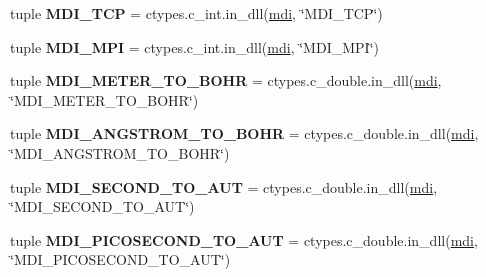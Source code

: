 \begin{DoxyCompactItemize}
\item 
\hypertarget{namespacemolssi__driver__interface_1_1mdi_a2cd83c28d46d7488dc81d0ab7d1e1b11}{tuple {\bfseries M\-D\-I\-\_\-\-T\-C\-P} = ctypes.\-c\-\_\-int.\-in\-\_\-dll(\hyperlink{classmdi}{mdi}, \char`\"{}M\-D\-I\-\_\-\-T\-C\-P\char`\"{})}\label{namespacemolssi__driver__interface_1_1mdi_a2cd83c28d46d7488dc81d0ab7d1e1b11}

\item 
\hypertarget{namespacemolssi__driver__interface_1_1mdi_a232cbdf0cd4b5f002a1163a9f71c5330}{tuple {\bfseries M\-D\-I\-\_\-\-M\-P\-I} = ctypes.\-c\-\_\-int.\-in\-\_\-dll(\hyperlink{classmdi}{mdi}, \char`\"{}M\-D\-I\-\_\-\-M\-P\-I\char`\"{})}\label{namespacemolssi__driver__interface_1_1mdi_a232cbdf0cd4b5f002a1163a9f71c5330}

\item 
\hypertarget{namespacemolssi__driver__interface_1_1mdi_a05bc005cf82c527130e4b3517355d24d}{tuple {\bfseries M\-D\-I\-\_\-\-M\-E\-T\-E\-R\-\_\-\-T\-O\-\_\-\-B\-O\-H\-R} = ctypes.\-c\-\_\-double.\-in\-\_\-dll(\hyperlink{classmdi}{mdi}, \char`\"{}M\-D\-I\-\_\-\-M\-E\-T\-E\-R\-\_\-\-T\-O\-\_\-\-B\-O\-H\-R\char`\"{})}\label{namespacemolssi__driver__interface_1_1mdi_a05bc005cf82c527130e4b3517355d24d}

\item 
\hypertarget{namespacemolssi__driver__interface_1_1mdi_a56a1ab0c7e9e1e0e55af72a20d1d0e3a}{tuple {\bfseries M\-D\-I\-\_\-\-A\-N\-G\-S\-T\-R\-O\-M\-\_\-\-T\-O\-\_\-\-B\-O\-H\-R} = ctypes.\-c\-\_\-double.\-in\-\_\-dll(\hyperlink{classmdi}{mdi}, \char`\"{}M\-D\-I\-\_\-\-A\-N\-G\-S\-T\-R\-O\-M\-\_\-\-T\-O\-\_\-\-B\-O\-H\-R\char`\"{})}\label{namespacemolssi__driver__interface_1_1mdi_a56a1ab0c7e9e1e0e55af72a20d1d0e3a}

\item 
\hypertarget{namespacemolssi__driver__interface_1_1mdi_ab087d6326f12a106a44d4ddaca4c8608}{tuple {\bfseries M\-D\-I\-\_\-\-S\-E\-C\-O\-N\-D\-\_\-\-T\-O\-\_\-\-A\-U\-T} = ctypes.\-c\-\_\-double.\-in\-\_\-dll(\hyperlink{classmdi}{mdi}, \char`\"{}M\-D\-I\-\_\-\-S\-E\-C\-O\-N\-D\-\_\-\-T\-O\-\_\-\-A\-U\-T\char`\"{})}\label{namespacemolssi__driver__interface_1_1mdi_ab087d6326f12a106a44d4ddaca4c8608}

\item 
\hypertarget{namespacemolssi__driver__interface_1_1mdi_ace2ba89b94963cf584ce8b1d00ebb59b}{tuple {\bfseries M\-D\-I\-\_\-\-P\-I\-C\-O\-S\-E\-C\-O\-N\-D\-\_\-\-T\-O\-\_\-\-A\-U\-T} = ctypes.\-c\-\_\-double.\-in\-\_\-dll(\hyperlink{classmdi}{mdi}, \char`\"{}M\-D\-I\-\_\-\-P\-I\-C\-O\-S\-E\-C\-O\-N\-D\-\_\-\-T\-O\-\_\-\-A\-U\-T\char`\"{})}\label{namespacemolssi__driver__interface_1_1mdi_ace2ba89b94963cf584ce8b1d00ebb59b}


\end{DoxyCompactItemize}
